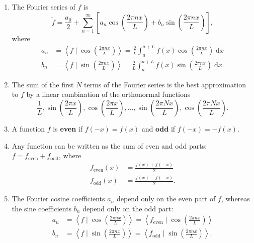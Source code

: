 \documentclass{article}
\newcommand{\diff}{\;\mathrm{d}}
\newcommand{\braket}[2]{\left\langle #1 \mid #2 \right\rangle}
\begin{document}
\begin{enumerate}
	\item The Fourier series of $f$ is
		\[\tilde{f}=\frac{a_0}{2}+\sum_{n=1}^\infty \left[a_n\cos\left(\frac{2\pi nx}{L}\right) + b_n\sin\left(\frac{2\pi nx}{L}\right)\right],\]
		where
		\begin{align*}
			a_n&=\braket{f}{\cos\left(\frac{2\pi nx}{L}\right)}=\frac{2}{L}\int_a^{a+L}\!\!\! f(x)\cos\left(\frac{2\pi nx}{L}\right)\diff x\\
			b_n &= \braket{f}{\sin\left(\frac{2\pi nx}{L}\right)}=\frac{2}{L}\int_a^{a+L}\!\!\! f(x)\sin\left(\frac{2\pi nx}{L}\right)\diff x.
		\end{align*}
	\item The sum of the first $N$ terms of the Fourier series is the best approximation to $f$ by a linear combination of the orthonormal functions
		\[\frac{1}{L},\sin\left(\frac{2\pi x}{L}\right),\cos\left(\frac{2\pi x}{L}\right),\hdots,\sin\left(\frac{2\pi Nx}{L}\right),\cos\left(\frac{2\pi Nx}{L}\right).\]
	\item A function $f$ is \textbf{even} if $f(-x)=f(x)$ and \textbf{odd} if $f(-x)=-f(x)$.
	\item Any function can be written as the sum of even and odd parts: $f=f_\mathrm{even}+f_\mathrm{odd}$, where
		\begin{align*}
			f_\mathrm{even}(x) &= \frac{f(x)+f(-x)}{2}\\
			f_\mathrm{odd}(x)&= \frac{f(x)-f(-x)}{2}.
		\end{align*}
	\item The Fourier cosine coefficients $a_n$ depend only on the even part of $f$, whereas the sine coefficients $b_n$ depend only on the odd part:
		\begin{align*}
			a_n&=\braket{f}{\cos\left(\frac{2\pi nx}{L}\right)}=\braket{f_\mathrm{even}}{\cos\left(\frac{2\pi nx}{L}\right)}\\
			b_n&=\braket{f}{\sin\left(\frac{2\pi nx}{L}\right)}=\braket{f_\mathrm{odd}}{\sin\left(\frac{2\pi nx}{L}\right)}.
		\end{align*}
\end{enumerate}
\end{document}
